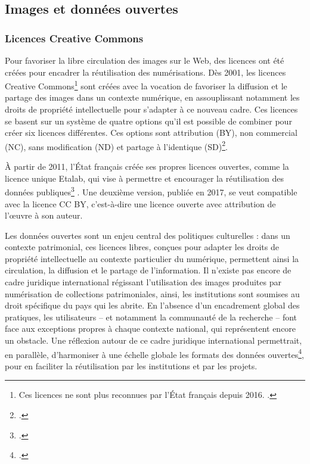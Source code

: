 \subsection{Images et données ouvertes}
    \subsubsection{Licences Creative Commons}
	Pour favoriser la libre circulation des images sur le Web, des licences ont été créées pour encadrer la réutilisation des numérisations. Dès 2001, les licences Creative Commons\footnote{Ces licences ne sont plus reconnues par l'État français depuis 2016. \cite{denoyelleSavoirLicenceEtalab2021}.} sont créées avec la vocation de favoriser la diffusion et le partage des images dans un contexte numérique, en assouplissant notamment les droits de propriété intellectuelle pour s'adapter à ce nouveau cadre. Ces licences se basent sur un système de quatre options qu'il est possible de combiner pour créer six licences différentes. Ces options sont attribution (BY), non commercial (NC), sans modification (ND) et partage à l’identique (SD)\footcite{GuidePratiquePour}. 
	
	À partir de 2011, l'État français créée ses propres licences ouvertes, comme la licence unique Etalab, qui vise à \og permettre et encourager la réutilisation des données publiques\footcite{denoyelleSavoirLicenceEtalab2021} \fg. Une deuxième version, publiée en 2017, se veut compatible avec la licence CC BY, c'est-à-dire une licence ouverte avec attribution de l'œuvre à son auteur.
	
	Les données ouvertes sont un enjeu central des politiques culturelles : dans un contexte patrimonial, ces licences libres, conçues pour adapter les droits de propriété intellectuelle au contexte particulier du numérique, permettent ainsi la circulation, la diffusion et le partage de l'information. Il n'existe pas encore de cadre juridique international régissant l'utilisation des images produites par numérisation de collections patrimoniales, ainsi, les institutions sont soumises au droit spécifique du pays qui les abrite. En l'absence d'un encadrement global des pratiques, les utilisateurs -- et notamment la communauté de la recherche -- font face aux exceptions propres à chaque contexte national, qui représentent encore un obstacle. Une réflexion autour de ce cadre juridique international permettrait, en parallèle, d'harmoniser à une échelle globale les formats des données ouvertes\footcite{benhamouDroitAuteurMusees2016}, pour en faciliter la réutilisation par les institutions et par les projets.

